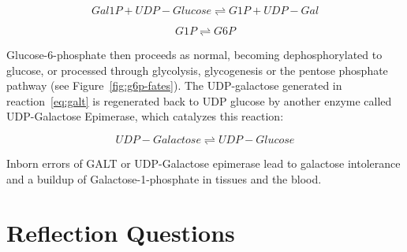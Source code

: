 \documentclass{tufte-handout}
\begin{document}
\begin{equation} \label{eq:galt}
Gal1P + UDP-Glucose \rightleftharpoons G1P + UDP-Gal
\end{equation}

\begin{equation}
G1P \rightleftharpoons G6P
\end{equation}

Glucose-6-phosphate then proceeds as normal, becoming dephosphorylated to glucose, or processed through glycolysis, glycogenesis or the pentose phosphate pathway (see Figure~\ref{fig:g6p-fates}).  The UDP-galactose generated in reaction~\ref{eq:galt} is regenerated back to UDP glucose by another enzyme called UDP-Galactose Epimerase, which catalyzes this reaction:

\begin{equation}
UDP-Galactose \rightleftharpoons UDP-Glucose
\end{equation}

Inborn errors of GALT or UDP-Galactose epimerase lead to galactose intolerance and a buildup of Galactose-1-phosphate in tissues and the blood.

\section{Reflection Questions}
\end{document}
